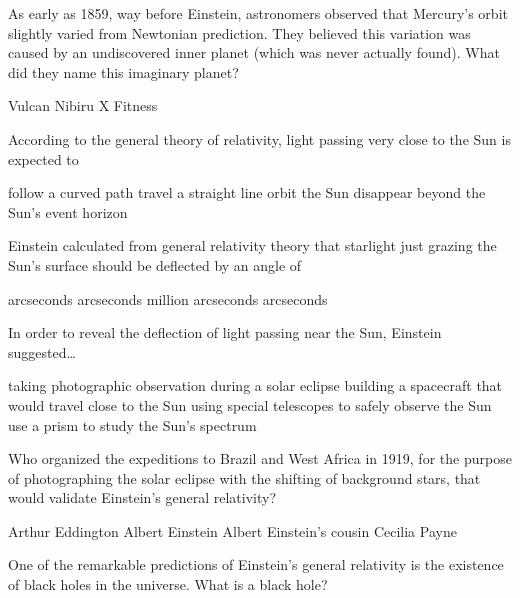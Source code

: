 \documentclass{exam}
\begin{document}
\begin{questions}
\question
As early as 1859, way before Einstein, astronomers observed that Mercury's orbit slightly varied from Newtonian prediction. They believed this variation was caused by an undiscovered inner planet (which was never actually found). What did they name this imaginary planet?

\begin{randomizechoices}
\correctchoice Vulcan 
\choice Nibiru
\choice X
\choice Fitness
\end{randomizechoices}

\question
According to the general theory of relativity, light passing very close to the Sun is expected to

\begin{randomizechoices}
\correctchoice follow a curved path
\choice travel a straight line
\choice orbit the Sun
\choice disappear beyond the Sun's event horizon
\end{randomizechoices}

\question
Einstein calculated from general relativity theory that starlight just grazing the Sun’s surface should be deflected by an angle of

\begin{randomizechoices}
 arcseconds
 arcseconds
 million arcseconds
 arcseconds
\end{randomizechoices}

\question
In order to reveal the deflection of light passing near the Sun, Einstein suggested\ldots 

\begin{randomizechoices}
\correctchoice taking photographic observation during a solar eclipse
\choice building a spacecraft that would travel close to the Sun
\choice using special telescopes to safely observe the Sun
\choice use a prism to study the Sun's spectrum
\end{randomizechoices}

\question
Who organized the expeditions to Brazil and West Africa in 1919, for the purpose of photographing the solar eclipse with the shifting of background stars, that would validate Einstein's general relativity?

\begin{randomizechoices}
    \correctchoice Arthur Eddington
    \choice Albert Einstein
    \choice Albert Einstein's cousin
    \choice Cecilia Payne
\end{randomizechoices}

\question
One of the remarkable predictions of Einstein's general relativity is the existence of black holes in the universe. What is a black hole?


\end{questions}
\end{document}
